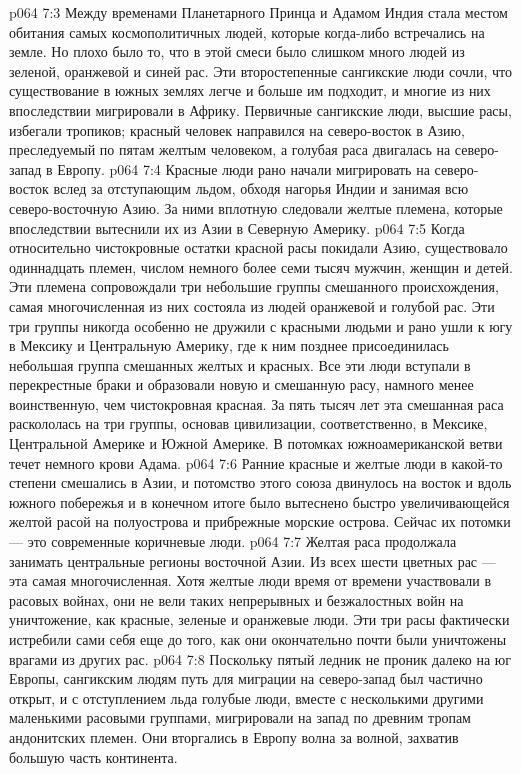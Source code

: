 \vs p064 7:3 Между временами Планетарного Принца и Адамом Индия стала местом обитания самых космополитичных людей, которые когда\hyp{}либо встречались на земле. Но плохо было то, что в этой смеси было слишком много людей из зеленой, оранжевой и синей рас. Эти второстепенные сангикские люди сочли, что существование в южных землях легче и больше им подходит, и многие из них впоследствии мигрировали в Африку. Первичные сангикские люди, высшие расы, избегали тропиков; красный человек направился на северо\hyp{}восток в Азию, преследуемый по пятам желтым человеком, а голубая раса двигалась на северо\hyp{}запад в Европу.
\vs p064 7:4 Красные люди рано начали мигрировать на северо\hyp{}восток вслед за отступающим льдом, обходя нагорья Индии и занимая всю северо\hyp{}восточную Азию. За ними вплотную следовали желтые племена, которые впоследствии вытеснили их из Азии в Северную Америку.
\vs p064 7:5 Когда относительно чистокровные остатки красной расы покидали Азию, существовало одиннадцать племен, числом немного более семи тысяч мужчин, женщин и детей. Эти племена сопровождали три небольшие группы смешанного происхождения, самая многочисленная из них состояла из людей оранжевой и голубой рас. Эти три группы никогда особенно не дружили с красными людьми и рано ушли к югу в Мексику и Центральную Америку, где к ним позднее присоединилась небольшая группа смешанных желтых и красных. Все эти люди вступали в перекрестные браки и образовали новую и смешанную расу, намного менее воинственную, чем чистокровная красная. За пять тысяч лет эта смешанная раса раскололась на три группы, основав цивилизации, соответственно, в Мексике, Центральной Америке и Южной Америке. В потомках южноамериканской ветви течет немного крови Адама.
\vs p064 7:6 Ранние красные и желтые люди в какой\hyp{}то степени смешались в Азии, и потомство этого союза двинулось на восток и вдоль южного побережья и в конечном итоге было вытеснено быстро увеличивающейся желтой расой на полуострова и прибрежные морские острова. Сейчас их потомки --- это современные коричневые люди.
\vs p064 7:7 Желтая раса продолжала занимать центральные регионы восточной Азии. Из всех шести цветных рас --- эта самая многочисленная. Хотя желтые люди время от времени участвовали в расовых войнах, они не вели таких непрерывных и безжалостных войн на уничтожение, как красные, зеленые и оранжевые люди. Эти три расы фактически истребили сами себя еще до того, как они окончательно почти были уничтожены врагами из других рас.
\vs p064 7:8 Поскольку пятый ледник не проник далеко на юг Европы, сангикским людям путь для миграции на северо\hyp{}запад был частично открыт, и с отступлением льда голубые люди, вместе с несколькими другими маленькими расовыми группами, мигрировали на запад по древним тропам андонитских племен. Они вторгались в Европу волна за волной, захватив большую часть континента.

